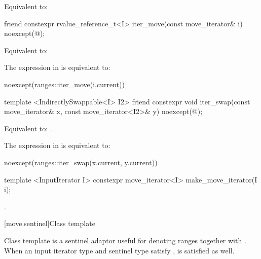 \begin{itemdescr}
\pnum
\effects Equivalent to:
\end{itemdescr}

%
%
\begin{itemdecl}
friend constexpr rvalue_reference_t<I> iter_move(const move_iterator& i)
  noexcept(@\seebelow@);
\end{itemdecl}

\begin{itemdescr}
\pnum
\effects Equivalent to: 

\pnum
\remarks The expression in  is equivalent to:
\begin{codeblock}
noexcept(ranges::iter_move(i.current))
\end{codeblock}
\end{itemdescr}

%
%
\begin{itemdecl}
template <IndirectlySwappable<I> I2>
  friend constexpr void iter_swap(const move_iterator& x, const move_iterator<I2>& y)
    noexcept(@\seebelow@);
\end{itemdecl}

\begin{itemdescr}
\pnum
\effects Equivalent to: .

\pnum
\remarks The expression in  is equivalent to:
\begin{codeblock}
noexcept(ranges::iter_swap(x.current, y.current))
\end{codeblock}
\end{itemdescr}

%
\begin{itemdecl}
template <InputIterator I>
  constexpr move_iterator<I> make_move_iterator(I i);
\end{itemdecl}

\begin{itemdescr}
\pnum
\returns {}.
\end{itemdescr}

[move.sentinel]{Class template }

\pnum
Class template  is a sentinel adaptor useful for denoting
ranges together with . When an input iterator type
 and sentinel type  satisfy ,
 is satisfied as well.

